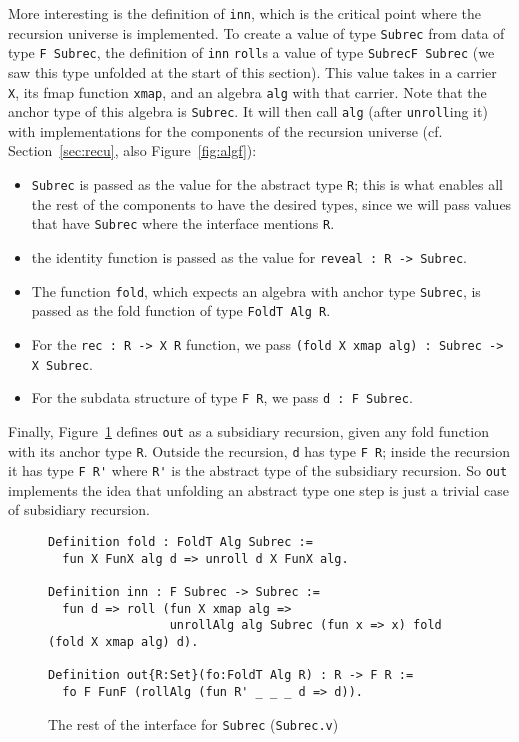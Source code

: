 \documentclass[a4paper,USenglish]{lipics-v2021}
\begin{document}
More interesting is the definition of \verb|inn|, which is the
critical point where the recursion universe is implemented.  To create
a value of type \verb|Subrec| from data of type \verb|F Subrec|, the
definition of \verb|inn| \verb|roll|s a value of type
\verb|SubrecF Subrec| (we saw this type unfolded at the start of
this section).  This value takes in a carrier
\verb|X|, its fmap function \verb|xmap|, and an algebra \verb|alg|
with that carrier.  Note that the anchor type of this algebra is
\verb|Subrec|.  It will then call \verb|alg| (after \verb|unroll|ing
it) with implementations for the components of the recursion universe
(cf. Section~\ref{sec:recu}, also Figure~\ref{fig:algf}):
\begin{itemize}
\item \verb|Subrec| is passed as the value for the abstract type \verb|R|; this is what enables all
  the rest of the components to have the desired types, since we will pass values that have \verb|Subrec|
  where the interface mentions \verb|R|.
\item the identity function is passed as the value for \verb|reveal : R -> Subrec|.
\item The function \verb|fold|, which expects an algebra with anchor type \verb|Subrec|, is passed as
  the fold function of type \verb|FoldT Alg R|. 
\item For the \verb|rec : R -> X R| function, we pass \verb|(fold X xmap alg) : Subrec -> X Subrec|.
\item For the subdata structure of type \verb|F R|, we pass \verb|d : F Subrec|. 
\end{itemize}

Finally, Figure~\ref{fig:subrecb} defines \verb|out| as a subsidiary
recursion, given any fold function with its anchor type \verb|R|.
Outside the recursion, \verb|d| has type \verb|F R|; inside the
recursion it has type \verb|F R'| where \verb|R'| is the abstract type
of the subsidiary recursion.  So \verb|out| implements the idea that
unfolding an abstract type one step is just a trivial case of
subsidiary recursion.

\begin{figure}
\begin{verbatim}
Definition fold : FoldT Alg Subrec := 
  fun X FunX alg d => unroll d X FunX alg.

Definition inn : F Subrec -> Subrec :=
  fun d => roll (fun X xmap alg =>
                 unrollAlg alg Subrec (fun x => x) fold (fold X xmap alg) d).

Definition out{R:Set}(fo:FoldT Alg R) : R -> F R :=
  fo F FunF (rollAlg (fun R' _ _ _ d => d)).
\end{verbatim}
\caption{The rest of the interface for \texttt{Subrec} (\texttt{Subrec.v})}
\label{fig:subrecb}
\end{figure}
\end{document}
